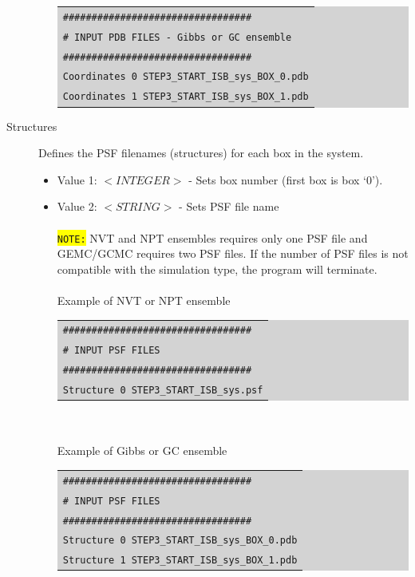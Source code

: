 \begin{description}
\begin{itemize}
	\colorbox{lightgray}{
	\begin{tabular}{l}
	\texttt{\#\#\#\#\#\#\#\#\#\#\#\#\#\#\#\#\#\#\#\#\#\#\#\#\#\#\#\#\#\#\#\#\#}\\
	\texttt{\# INPUT PDB FILES - Gibbs or GC ensemble}\\
	\texttt{\#\#\#\#\#\#\#\#\#\#\#\#\#\#\#\#\#\#\#\#\#\#\#\#\#\#\#\#\#\#\#\#\#}\\
	\texttt{Coordinates 0 STEP3\_START\_ISB\_sys\_BOX\_0.pdb}\\
	\texttt{Coordinates 1 STEP3\_START\_ISB\_sys\_BOX\_1.pdb}\\
	\end{tabular}}
	\end{itemize}
\item [Structures] Defines the PSF filenames (structures) for each box in the system.
	\begin{itemize}	
	\item Value 1: $<INTEGER>$ - Sets box number (first box is box `0').\\
	\item Value 2: $<STRING>$ - Sets PSF file name\\\\
	\colorbox{yellow}{\texttt{NOTE:}} NVT and NPT ensembles requires only one PSF file and GEMC/GCMC requires two PSF files. If the number of PSF files is not compatible with the simulation type, the program will terminate. \\\\
	Example of NVT or NPT ensemble\\
	\colorbox{lightgray}{
	\begin{tabular}{l}
	\texttt{\#\#\#\#\#\#\#\#\#\#\#\#\#\#\#\#\#\#\#\#\#\#\#\#\#\#\#\#\#\#\#\#\#}\\
	\texttt{\# INPUT PSF FILES}\\
	\texttt{\#\#\#\#\#\#\#\#\#\#\#\#\#\#\#\#\#\#\#\#\#\#\#\#\#\#\#\#\#\#\#\#\#}\\
	\texttt{Structure 0 STEP3\_START\_ISB\_sys.psf}\\
	\end{tabular}}\\\\
	Example of Gibbs or GC ensemble\\
	\colorbox{lightgray}{
	\begin{tabular}{l}
	\texttt{\#\#\#\#\#\#\#\#\#\#\#\#\#\#\#\#\#\#\#\#\#\#\#\#\#\#\#\#\#\#\#\#\#}\\
	\texttt{\# INPUT PSF FILES}\\
	\texttt{\#\#\#\#\#\#\#\#\#\#\#\#\#\#\#\#\#\#\#\#\#\#\#\#\#\#\#\#\#\#\#\#\#}\\
	\texttt{Structure 0 STEP3\_START\_ISB\_sys\_BOX\_0.pdb}\\
	\texttt{Structure 1 STEP3\_START\_ISB\_sys\_BOX\_1.pdb}\\
	\end{tabular}}
	\end{itemize}
\end{description}
